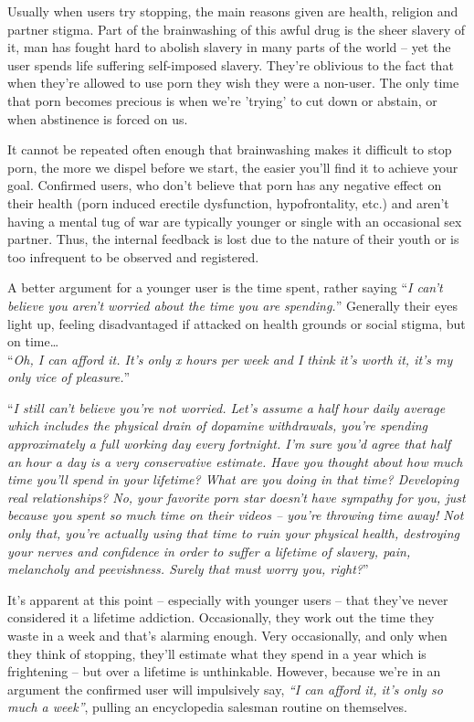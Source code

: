\documentclass[
]{book}
\begin{document}
Usually when users try stopping, the main reasons given are health, religion and partner stigma. Part of the brainwashing of this awful drug is the sheer slavery of it, man has fought hard to abolish slavery in many parts of the world -- yet the user spends life suffering self-imposed slavery. They're oblivious to the fact that when they're allowed to use porn they wish they were a non-user. The only time that porn becomes precious is when we're 'trying' to cut down or abstain, or when abstinence is forced on us.

It cannot be repeated often enough that brainwashing makes it difficult to stop porn, the more we dispel before we start, the easier you'll find it to achieve your goal. Confirmed users, who don't believe that porn has any negative effect on their health (porn induced erectile dysfunction, hypofrontality, etc.) and aren't having a mental tug of war are typically younger or single with an occasional sex partner. Thus, the internal feedback is lost due to the nature of their youth or is too infrequent to be observed and registered.

A better argument for a younger user is the time spent, rather saying ``\emph{I can't believe you aren't worried about the time you are spending.}'' Generally their eyes light up, feeling disadvantaged if attacked on health grounds or social stigma, but on time\ldots{}\\
``\emph{Oh, I can afford it. It's only x hours per week and I think it's worth it, it's my only vice of pleasure.}''

``\emph{I still can't believe you're not worried. Let's assume a half hour daily average which includes the physical drain of dopamine withdrawals, you're spending approximately a full working day every fortnight. I'm sure you'd agree that half an hour a day is a very conservative estimate. Have you thought about how much time you'll spend in your lifetime? What are you doing in that time? Developing real relationships? No, your favorite porn star doesn't have sympathy for you, just because you spent so much time on their videos -- you're throwing time away! Not only that, you're actually using that time to ruin your physical health, destroying your nerves and confidence in order to suffer a lifetime of slavery, pain, melancholy and peevishness. Surely that must worry you, right?}''

It's apparent at this point -- especially with younger users -- that they've never considered it a lifetime addiction. Occasionally, they work out the time they waste in a week and that's alarming enough. Very occasionally, and only when they think of stopping, they'll estimate what they spend in a year which is frightening -- but over a lifetime is unthinkable. However, because we're in an argument the confirmed user will impulsively say, \emph{``I can afford it, it's only so much a week''}, pulling an encyclopedia salesman routine on themselves.
\end{document}
